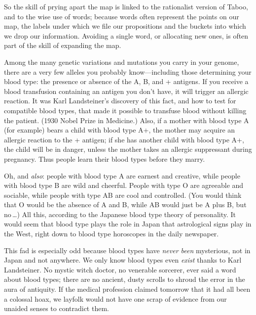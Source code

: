 { So the skill of prying apart the map is linked to the rationalist
version of Taboo, and to the wise use of words; because words often
represent the points on our map, the labels under which we file our
propositions and the buckets into which we drop our information.
Avoiding a single word, or allocating new ones, is often part of the
skill of expanding the map.

\myendsectiontext



 Among the many genetic variations and mutations you carry in your
genome, there are a very few alleles you probably know---including
those determining your blood type: the presence or absence of the A, B,
and + antigens. If you receive a blood transfusion containing an
antigen you don't have, it will trigger an allergic
reaction. It was Karl Landsteiner's discovery of this
fact, and how to test for compatible blood types, that made it possible
to transfuse blood without killing the patient. (1930 Nobel Prize in
Medicine.) Also, if a mother with blood type A (for example) bears a
child with blood type A+, the mother may acquire an allergic reaction
to the + antigen; if she has another child with blood type A+, the
child will be in danger, unless the mother takes an allergic
suppressant during pregnancy. Thus people learn their blood types
before they marry. 


 Oh, and \textit{also}: people with blood type A are earnest and
creative, while people with blood type B are wild and cheerful. People
with type O are agreeable and sociable, while people with type AB are
cool and controlled. (You would think that O would be the absence of A
and B, while AB would just be A plus B, but no\,\ldots) All this,
according to the Japanese blood type theory of personality. It would
seem that blood type plays the role in Japan that astrological signs
play in the West, right down to blood type horoscopes in the daily
newspaper.


 This fad is especially odd because blood types have \textit{never
been} mysterious, not in Japan and not anywhere. We only know blood
types even \textit{exist} thanks to Karl Landsteiner. No mystic witch
doctor, no venerable sorcerer, ever said a word about blood types;
there are no ancient, dusty scrolls to shroud the error in the aura of
antiquity. If the medical profession claimed tomorrow that it had all
been a colossal hoax, we layfolk would not have one scrap of evidence
from our unaided senses to contradict them.


}
